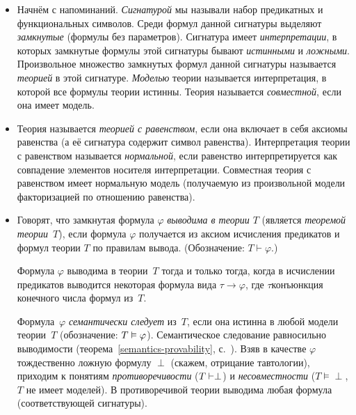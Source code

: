 \begin{itemize}
        \item
Начнём с напоминаний. \emph{Сигнатурой}%
мы называли набор
предикатных и функциональных символов. Среди формул данной
сигнатуры выделяют \emph{замкнутые}%
%
(формулы без параметров).
Сигнатура имеет \emph{интерпретации},%
%
в которых замкнутые
формулы этой сигнатуры бывают \emph{истинными}%
%
и \emph{ложными}.%
%
Произвольное множество замкнутых формул данной сигнатуры
называется \emph{теорией}%
в этой сигнатуре. \emph{Моделью}%
%
теории называется интерпретация, в которой все формулы теории
истинны. Теория называется \emph{совместной},%
%
если она имеет модель.

        \item
Теория называется \emph{теорией с равенством}, если она включает
в себя аксиомы равенства (а её сигнатура содержит символ
равенства). Интерпретация теории с равенством называется
\emph{нормальной}, если равенство интерпретируется как
совпадение элементов носителя интерпретации. Совместная теория с
равенством имеет нормальную модель (получаемую из произвольной
модели факторизацией по отношению равенства).

        \item
Говорят, что замкнутая формула $\varphi$ \emph{выводима в теории
$T$} (является \emph{теоремой теории~$T$}),
если формула $\varphi$ получается из аксиом исчисления предикатов
и формул теории $T$ по правилам вывода. (Обозначение: $T\vdash\varphi$.)

Формула $\varphi$ выводима в теории~$T$ тогда и только тогда,
когда в исчислении предикатов выводится некоторая формула вида
$\tau\to\varphi$, где $\tau$\т конъюнкция конечного числа формул
из~$T$.

Формула~$\varphi$
\emph{семантически следует} из~$T$, если она истинна в любой
модели теории~$T$ (обозначение: $T\hm\vDash\varphi$). Семантическое
следование равносильно выводимости
(теорема~\ref{semantics-provability},
с.~\pageref{semantics-provability}). Взяв в качестве $\varphi$
тождественно ложную формулу $\perp$ (скажем, отрицание
тавтологии), приходим к понятиям \emph{противоречивости}%
($T\hm\vdash\perp$) и \emph{несовместности}%
(${T\vDash\perp}$,
$T$ не имеет моделей).
В противоречивой теории
выводима любая формула (соответствующей сигнатуры).


\end{itemize}

